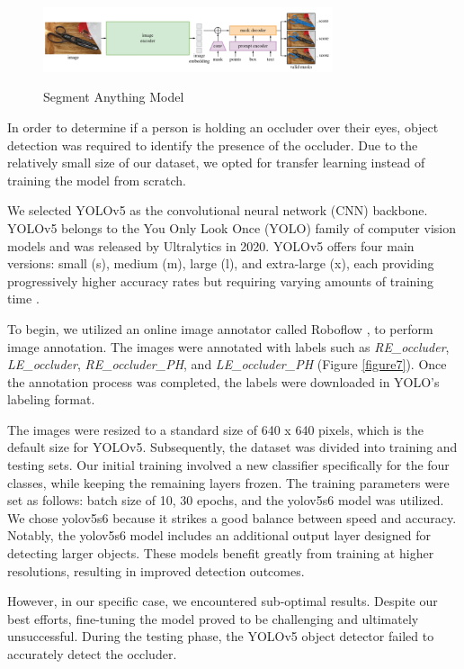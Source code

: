\documentclass{article}
\begin{document}
\begin{figure}[tbh]
    \begin{center}
        \includegraphics[width=8.5cm]{sam.png}\
        \caption{Segment Anything Model\label{figure2}} 
    \end{center}
\end{figure}

In order to determine if a person is holding an occluder over their eyes, object detection was required to identify the presence of the occluder. Due to the relatively small size of our dataset, we opted for transfer learning instead of training the model from scratch.

We selected YOLOv5 as the convolutional neural network (CNN) backbone. YOLOv5 belongs to the You Only Look Once (YOLO) \cite{redmon2016yolo} family of computer vision models and was released by Ultralytics in 2020. YOLOv5 offers four main versions: small (s), medium (m), large (l), and extra-large (x), each providing progressively higher accuracy rates but requiring varying amounts of training time \cite{ultralytics_yolov5}.

To begin, we utilized an online image annotator called Roboflow \cite{roboflow}, to perform image annotation. The images were annotated with labels such as \textit{RE\_occluder}, \textit{LE\_occluder}, \textit{RE\_occluder\_PH}, and \textit{LE\_occluder\_PH} (Figure \ref{figure7}). Once the annotation process was completed, the labels were downloaded in YOLO's labeling format. 

The images were resized to a standard size of 640 x 640 pixels, which is the default size for YOLOv5. Subsequently, the dataset was divided into training and testing sets. Our initial training involved a new classifier specifically for the four classes, while keeping the remaining layers frozen. The training parameters were set as follows: batch size of 10, 30 epochs, and the yolov5s6 model was utilized. We chose yolov5s6 because it strikes a good balance between speed and accuracy. Notably, the yolov5s6 model includes an additional output layer designed for detecting larger objects. These models benefit greatly from training at higher resolutions, resulting in improved detection outcomes.

However, in our specific case, we encountered sub-optimal results. Despite our best efforts, fine-tuning the model proved to be challenging and ultimately unsuccessful. During the testing phase, the YOLOv5 object detector failed to accurately detect the occluder.
\end{document}
